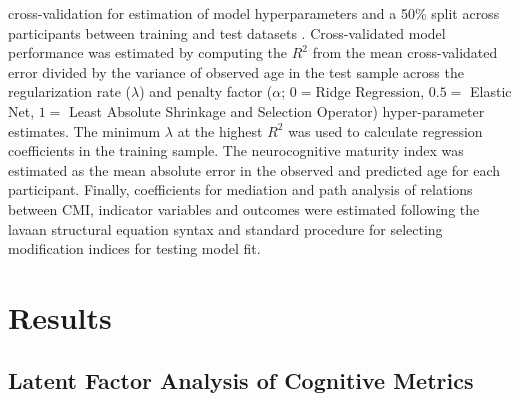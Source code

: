 \documentclass[utf8]{stylesheet}
\begin{document}
cross-validation for estimation of model hyperparameters and a 50\% split across participants between training and test datasets \citep{FriedmanHastieTibshirani2010, friedman2009glmnet}. Cross-validated model performance was estimated by computing the $R^2$ from the mean cross-validated error divided by the variance of observed age in the test sample across the regularization rate ($\lambda$) and penalty factor ($\alpha$; $0 = $Ridge Regression, $0.5 = $ Elastic Net, $1 =$ Least Absolute Shrinkage and Selection Operator) hyper-parameter estimates. The minimum $\lambda$ at the highest $R^2$ was used to calculate regression coefficients in the training sample. The neurocognitive maturity index was estimated as the mean absolute error in the observed and predicted age for each participant. Finally, coefficients for mediation and path analysis of relations between CMI, indicator variables and outcomes were estimated following the lavaan structural equation syntax and standard procedure for selecting modification indices for testing model fit.
\section{Results} 
\subsection{Latent Factor Analysis of Cognitive Metrics} 
\end{document}
